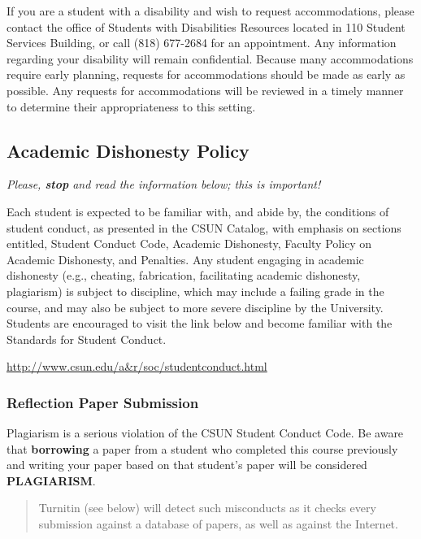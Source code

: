 \documentclass[11pt,]{article}
\begin{document}
If you are a student with a disability and wish to request
accommodations, please contact the office of Students with Disabilities
Resources located in 110 Student Services Building, or call (818)
677-2684 for an appointment. Any information regarding your disability
will remain confidential. Because many accommodations require early
planning, requests for accommodations should be made as early as
possible. Any requests for accommodations will be reviewed in a timely
manner to determine their appropriateness to this setting.

\hypertarget{academic-dishonesty-policy}{%
\subsection{Academic Dishonesty
Policy}\label{academic-dishonesty-policy}}

\emph{Please, \textbf{stop} and read the information below; this is
important!}

Each student is expected to be familiar with, and abide by, the
conditions of student conduct, as presented in the CSUN Catalog, with
emphasis on sections entitled, Student Conduct Code, Academic
Dishonesty, Faculty Policy on Academic Dishonesty, and Penalties. Any
student engaging in academic dishonesty (e.g., cheating, fabrication,
facilitating academic dishonesty, plagiarism) is subject to discipline,
which may include a failing grade in the course, and may also be subject
to more severe discipline by the University. Students are encouraged to
visit the link below and become familiar with the Standards for Student
Conduct.

\url{http://www.csun.edu/a\&r/soc/studentconduct.html}

\hypertarget{reflection-paper-submission}{%
\subsubsection{Reflection Paper
Submission}\label{reflection-paper-submission}}

Plagiarism is a serious violation of the CSUN Student Conduct Code. Be
aware that \textbf{borrowing} a paper from a student who completed this
course previously and writing your paper based on that student's paper
will be considered \textbf{PLAGIARISM}.

\begin{quote}
Turnitin (see below) will detect such misconducts as it checks every
submission against a database of papers, as well as against the
Internet.
\end{quote}
\end{document}
